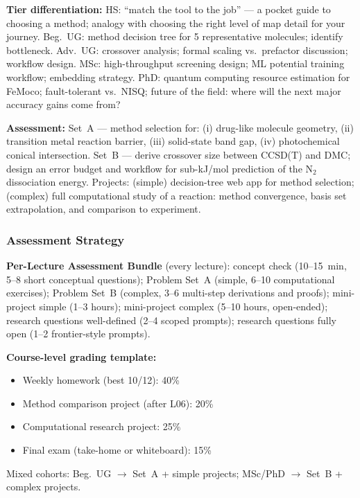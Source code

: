 \documentclass[11pt,a4paper]{article}
\begin{document}
\begin{tcolorbox}[modulebox, title={Module~II.1 --- Lecture L12: Method Selection in Practice}]
\medskip\textbf{Tier differentiation:}
HS: ``match the tool to the job'' --- a pocket guide to choosing a method;
analogy with choosing the right level of map detail for your journey.
Beg.\ UG: method decision tree for 5 representative molecules; identify bottleneck.
Adv.\ UG: crossover analysis; formal scaling vs.\ prefactor discussion; workflow design.
MSc: high-throughput screening design; ML potential training workflow; embedding strategy.
PhD: quantum computing resource estimation for FeMoco; fault-tolerant vs.\ NISQ;
future of the field: where will the next major accuracy gains come from?

\medskip\textbf{Assessment:}
Set~A --- method selection for: (i) drug-like molecule geometry, (ii) transition metal
  reaction barrier, (iii) solid-state band gap, (iv) photochemical conical intersection.
Set~B --- derive crossover size between CCSD(T) and DMC; design an error budget and workflow
for sub-kJ/mol prediction of the N$_2$ dissociation energy.
Projects: (simple) decision-tree web app for method selection;
(complex) full computational study of a reaction: method convergence, basis set extrapolation,
and comparison to experiment.
\end{tcolorbox}

\subsubsection*{Assessment Strategy}

\begin{tcolorbox}[highlightbox]
\textbf{Per-Lecture Assessment Bundle} (every lecture):
concept check (10--15~min, 5--8 short conceptual questions);
Problem Set~A (simple, 6--10 computational exercises);
Problem Set~B (complex, 3--6 multi-step derivations and proofs);
mini-project simple (1--3 hours);
mini-project complex (5--10 hours, open-ended);
research questions well-defined (2--4 scoped prompts);
research questions fully open (1--2 frontier-style prompts).
\end{tcolorbox}

\medskip
\noindent\textbf{Course-level grading template:}
\begin{itemize}[leftmargin=1.5em]
  \item Weekly homework (best 10/12): 40\%
  \item Method comparison project (after L06): 20\%
  \item Computational research project: 25\%
  \item Final exam (take-home or whiteboard): 15\%
\end{itemize}
Mixed cohorts: Beg.\ UG $\to$ Set~A + simple projects; MSc/PhD $\to$ Set~B + complex projects.
\end{document}
